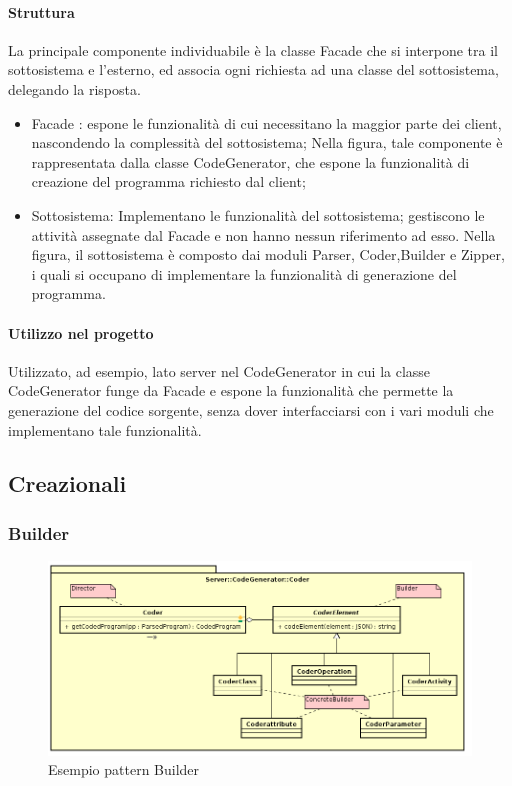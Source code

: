 \documentclass[../PianoDiQualifica.tex]{subfiles}
\begin{document}
				\paragraph{Struttura\\}
					La principale componente individuabile è la classe Facade che si interpone tra il
					sottosistema e l'esterno, ed associa ogni richiesta ad una classe del sottosistema,
					delegando la risposta.
					\begin{itemize}
						\item Facade : espone le funzionalità di cui necessitano la maggior parte dei client, nascondendo la complessità del sottosistema; Nella figura, tale componente è rappresentata dalla classe CodeGenerator, che espone la funzionalità di creazione del programma richiesto dal client;
						\item Sottosistema: Implementano le funzionalità del sottosistema; gestiscono le attività assegnate dal Facade e non hanno nessun riferimento ad esso. Nella figura, il sottosistema è composto dai moduli Parser, Coder,Builder e Zipper, i quali si occupano di implementare la funzionalità di generazione del programma.
					\end{itemize}
					
				\paragraph{Utilizzo nel progetto\\}
					Utilizzato, ad esempio, lato server nel CodeGenerator in cui la classe CodeGenerator funge da Facade e espone la funzionalità che permette la generazione del codice sorgente, senza dover interfacciarsi con i vari moduli che implementano tale funzionalità.
		\subsection{Creazionali}
			\subsubsection{Builder}
				\begin{figure}[H] \label{fig:Builder}
					\centering
					\includegraphics[scale=0.8]{Immagini/Builder.png}
					\caption{Esempio pattern Builder}
				\end{figure}
\end{document}
